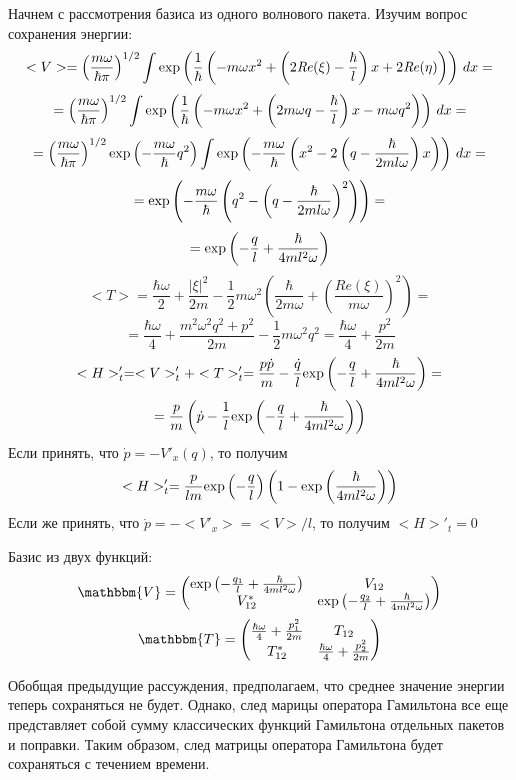 Начнем с рассмотрения базиса из одного волнового пакета.
Изучим вопрос сохранения энергии:
$$<V> = \left(\frac{m\omega}{\hbar\pi}\right)^{1/2}%
	\int \myexp{\frac{1}{\hbar}\left(-m\omega x^2 + %
					 \left(2\mathit{Re}(\xi)-%
					 \frac{\hbar}{l}\right)x + %
					 2\mathit{Re}(\eta)\right)}\,dx=$$
$$=\left(\frac{m\omega}{\hbar\pi}\right)^{1/2}%
   \int \myexp{\frac{1}{\hbar}\left(-m\omega x^2 + %
					 \left(2m\omega q-%
					 \frac{\hbar}{l}\right)x - %
					 m\omega q^2\right)}\,dx=$$
$$=\left(\frac{m\omega}{\hbar\pi}\right)^{1/2}%
   \myexp{-\frac{m\omega}{\hbar} q^2}\int\myexp{-\frac{m\omega}{\hbar}%
						\left( x^2 - 2\left(q - %
						    \frac{\hbar}{2ml\omega}%
						\right)x
						\right)}\,dx=$$
$$=\myexp{-\frac{m\omega}{\hbar}\left(q^2-%
				     \left(q-%
				     \frac{\hbar}{2ml\omega}%
				     \right)^2\right)}=$$
$$=\text{exp}\left( -\frac{q}{l}+\frac{\hbar}{4ml^2\omega} \right)$$
$$<T> = \frac{\hbar\omega}{2}+%
	\frac{|\xi|^2}{2m}-%
	\frac{1}{2}m\omega^2%
	\left(\frac{\hbar}{2m\omega}+%
	\left(\frac{\mathit{Re}(\xi)}{m\omega}%
	\right)^2\right)=$$
$$=\frac{\hbar\omega}{4}+%
   \frac{m^2\omega^2q^2+p^2}{2m}-%
   \frac{1}{2}m\omega^2q^2 = \frac{\hbar\omega}{4}+\frac{p^2}{2m}$$
$$<H>'_t=<V>'_t+<T>'_t=\frac{p\dot{p}}{m}-%
		       \frac{\dot{q}}{l}\myexp{-\frac{q}{l}+%
					       \frac{\hbar}{4ml^2\omega}}=$$
$$=\frac{p}{m}\left(\dot{p}-\frac{1}{l}\myexp{-\frac{q}{l}+%
					      \frac{\hbar}{4ml^2\omega}}%
	      \right)$$
Если принять, что $\dot{p} = -V'_x(q)$, то получим
$$<H>'_t=\frac{p}{lm}\myexp{-\frac{q}{l}}%
	 \left(1-\myexp{\frac{\hbar}{4ml^2\omega}}\right)$$
Если же принять, что $\dot{p}=-<V'_x>=<V>/l$, то получим $<H>'_t=0$

Базис из двух функций:
$$\mathbbm{V} = \left( \begin{matrix} %
		\myexp{-\frac{q_1}{l}+\frac{\hbar}{4ml^2\omega}} & %
		V_{12} \\ %
		V_{12}^* & %
		\myexp{-\frac{q_2}{l}+\frac{\hbar}{4ml^2\omega}} \\ %
		\end{matrix} \right)$$
$$\mathbbm{T} = \left( \begin{matrix} %
		       \frac{\hbar\omega}{4}+\frac{p_1^2}{2m} & %
		       T_{12} \\ %
		       T_{12}^* & %
		       \frac{\hbar\omega}{4}+\frac{p_2^2}{2m} %
		       \end{matrix} \right)$$

Обобщая предыдущие рассуждения, предполагаем, 
что среднее значение энергии теперь сохраняться не будет. 
Однако, след марицы оператора Гамильтона все еще представляет собой сумму классических функций 
Гамильтона отдельных пакетов и поправки. 
Таким образом, след матрицы оператора Гамильтона будет сохраняться с течением времени.

